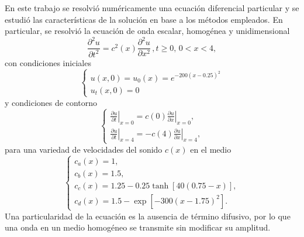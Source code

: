 \documentclass[aps,prb,twocolumn,superscriptaddress,floatfix,longbibliography,10pt]{revtex4-2}
\newcounter{para}
\begin{document}
En este trabajo se resolvió numéricamente una ecuación diferencial particular y se estudió las características de la solución en base a los métodos empleados. En particular, se resolvió la ecuación de onda escalar, homogénea y unidimensional
\begin{equation}
  \frac{\partial^2 u}{\partial t^2} = c^2(x)\frac{\partial^2 u}{\partial x^2} \,, t \geq 0, \,  0 < x < 4,
  \label{eq:ecuacion_ondas}
\end{equation}
con condiciones iniciales
\begin{equation}
  \left\{\begin{matrix}
    u(x,0) = u_0(x) = e^{-200 (x-0.25)^2} \\
    u_t(x,0) = 0
   \end{matrix}\right.
  \label{eq:condiciones_iniciales}
\end{equation}
y condiciones de contorno
\begin{equation}
  \left \{\begin{matrix}
    \left . \frac{\partial u}{\partial t} \right |_{x=0} = c(0) \left . \frac{\partial u}{\partial x} \right |_{x=0} ,\\
    \left . \frac{\partial u}{\partial t} \right |_{x=4} = - c(4) \left . \frac{\partial u}{\partial x} \right |_{x=4},
   \end{matrix}\right .
  \label{eq:condiciones_contorno}
\end{equation}
para una variedad de velocidades del sonido $c(x)$ en el medio
\[ \left\{\begin{matrix}
 c_a(x) = 1, \\
 c_b(x) = 1.5, \\
 c_c(x) = 1.25 -0.25 \tanh{[40(0.75-x)]}, \\
 c_d(x) = 1.5 - \exp{[-300(x-1.75)^2]}.
 \end{matrix}\right.
\]
Una particularidad de la ecuación es la ausencia de término difusivo, por lo que una onda en un medio homogéneo se transmite sin modificar su amplitud.


\end{document}
